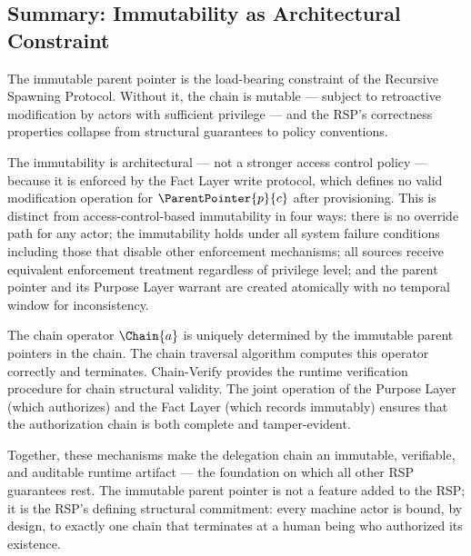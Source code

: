 \subsection{Summary: Immutability as Architectural Constraint}
\label{sec:immutability-summary}

The immutable parent pointer is the load-bearing constraint of the Recursive Spawning Protocol. Without it, the chain is mutable — subject to retroactive modification by actors with sufficient privilege — and the RSP's correctness properties collapse from structural guarantees to policy conventions.

The immutability is architectural — not a stronger access control policy — because it is enforced by the Fact Layer write protocol, which defines no valid modification operation for $\ParentPointer{p}{c}$ after provisioning. This is distinct from access-control-based immutability in four ways: there is no override path for any actor; the immutability holds under all system failure conditions including those that disable other enforcement mechanisms; all sources receive equivalent enforcement treatment regardless of privilege level; and the parent pointer and its Purpose Layer warrant are created atomically with no temporal window for inconsistency.

The chain operator $\Chain{a}$ is uniquely determined by the immutable parent pointers in the chain. The chain traversal algorithm computes this operator correctly and terminates. Chain-Verify provides the runtime verification procedure for chain structural validity. The joint operation of the Purpose Layer (which authorizes) and the Fact Layer (which records immutably) ensures that the authorization chain is both complete and tamper-evident.

Together, these mechanisms make the delegation chain an immutable, verifiable, and auditable runtime artifact — the foundation on which all other RSP guarantees rest. The immutable parent pointer is not a feature added to the RSP; it is the RSP's defining structural commitment: every machine actor is bound, by design, to exactly one chain that terminates at a human being who authorized its existence.

